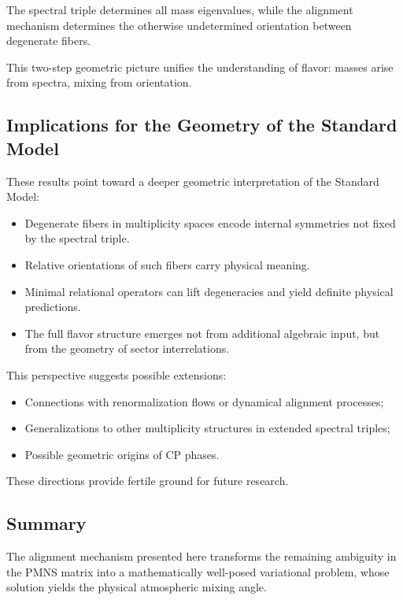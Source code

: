 The spectral triple determines all mass eigenvalues, while the alignment mechanism determines the otherwise undetermined orientation between degenerate fibers.

This two-step geometric picture unifies the understanding of flavor: masses arise from spectra, mixing from orientation.

\subsection{Implications for the Geometry of the Standard Model}

These results point toward a deeper geometric interpretation of the Standard Model:

\begin{itemize}
\item Degenerate fibers in multiplicity spaces encode internal symmetries not fixed by the spectral triple.
\item Relative orientations of such fibers carry physical meaning.
\item Minimal relational operators can lift degeneracies and yield definite physical predictions.
\item The full flavor structure emerges not from additional algebraic input, but from the geometry of sector interrelations.
\end{itemize}

This perspective suggests possible extensions:

\begin{itemize}
\item Connections with renormalization flows or dynamical alignment processes;
\item Generalizations to other multiplicity structures in extended spectral triples;
\item Possible geometric origins of CP phases.
\end{itemize}

These directions provide fertile ground for future research.

\subsection{Summary}

The alignment mechanism presented here transforms the remaining ambiguity in the PMNS matrix into a mathematically well-posed variational problem, whose solution yields the physical atmospheric mixing angle.

